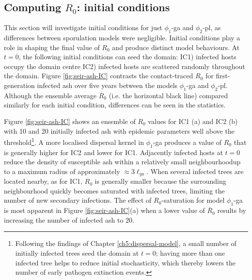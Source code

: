 \subsection{Computing $R_0$: initial conditions}

\label{section:initial-conditions}

This section will investigate initial conditions for just $\phi_1$-ga and $\phi_2$-pl, 
as differences between sporulation models were negligible.
Initial conditions play a role in shaping the final value of $R_0$ and produce distinct model behaviours. 
At $t=0$, the following initial conditions can seed the domain:  
IC1) infected hosts occupy the domain centre  
IC2) infected hosts are scattered randomly throughout the domain.
Figure \ref{fig:seir-ash-IC} contrasts the contact-traced $R_0$ for 
first-generation infected ash over five years between the models $\phi_1$-ga and $\phi_2$-pl.
Although the ensemble average $\overline{R}_0$ (i.e. the horizontal black line) compared similarly 
for each initial condition, differences can be seen in the statistics.

Figure \ref{fig:seir-ash-IC} shows an ensemble of $R_0$ values for IC1 (a) and IC2 (b) with 10 and 20 initially infected 
ash with epidemic parameters well above the threshold\footnote{
Following the findings of Chapter \ref{ch5:dispersal-model}, a small number of initially infected trees seed 
the domain at $t=0$; having more than one infected tree helps to reduce initial stochasticity, 
which thereby lowers the number of early pathogen extinction events.}.
A more localised dispersal kernel in $\phi_1$-ga produces a value of $R_0$ that is generally higher for IC2 and lower for IC1.
Adjacently infected hosts at $t=0$ reduce the density of susceptible ash within a relatively small 
neighbourhood\textemdash up to a maximum radius of approximately $\approx 3\ell_{ga}$.
When several infected trees are located nearby, as for IC1, $R_0$ is generally smaller because the
surrounding neighbourhood quickly becomes saturated with infected trees, limiting the number of new secondary infections.
The effect of $R_0$-saturation for model $\phi_1$-ga is most apparent in Figure \ref{fig:seir-ash-IC}(a) 
when a lower value of $\overline{R}_0$ results by increasing the number of infected ash to 20.

